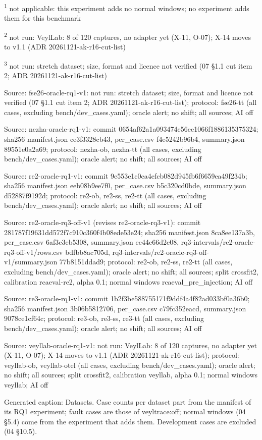 \par\raggedright\noindent
\textsuperscript{1} not applicable: this experiment adds no normal windows; no experiment adds them for this benchmark\par
\textsuperscript{2} not run: VeylLab: 8 of 120 captures, no adapter yet (X-11, O-07); X-14 moves to v1.1 (ADR 20261121-ak-r16-cut-list)\par
\textsuperscript{3} not run: stretch dataset; size, format and licence not verified (07 \S{}1.1 cut item 2; ADR 20261121-ak-r16-cut-list)\par
\noindent Source: fse26-oracle-rq1-v1: not run: stretch dataset; size, format and licence not verified (07 \S{}1.1 cut item 2; ADR 20261121-ak-r16-cut-list); protocol: fse26-tt (all cases, excluding bench/\allowbreak{}dev\_cases.yaml); oracle alert; no shift; all sources; AI off\par
\noindent Source: nezha-oracle-rq1-v1: commit 0654af62a1a093474e56ee1066f1886135375324; sha256 manifest.json ce3f3328cb43, per\_case.csv f4e5242b96b4, summary.json 89551e0a2a69; protocol: nezha-ob, nezha-tt (all cases, excluding bench/\allowbreak{}dev\_cases.yaml); oracle alert; no shift; all sources; AI off\par
\noindent Source: re2-oracle-rq1-v1: commit 9e553e1c0ca4efcb082d945fb6f6659ea49f234b; sha256 manifest.json eeb08b9ee7f0, per\_case.csv b5c320cd0bde, summary.json d52887f9192d; protocol: re2-ob, re2-ss, re2-tt (all cases, excluding bench/\allowbreak{}dev\_cases.yaml); oracle alert; no shift; all sources; AI off\par
\noindent Source: re2-oracle-rq3-off-v1 (revises re2-oracle-rq3-v1): commit 281787f19631dd572f7c910c360f4b08ede53e24; sha256 manifest.json 8ca8ee137a3b, per\_case.csv 6af3c3eb5308, summary.json ee44c66d2e08, rq3-intervals/\allowbreak{}re2-oracle-rq3-off-v1/\allowbreak{}rows.csv bdfbb8ac705d, rq3-intervals/\allowbreak{}re2-oracle-rq3-off-v1/\allowbreak{}summary.json 77b8151ddad9; protocol: re2-ob, re2-ss, re2-tt (all cases, excluding bench/\allowbreak{}dev\_cases.yaml); oracle alert; no shift; all sources; split crossfit2, calibration rcaeval-re2, alpha 0.1; normal windows rcaeval\_pre\_injection; AI off\par
\noindent Source: re3-oracle-rq1-v1: commit 1b2f3be588755171f9ddf4a4f82ad033bf0a36b0; sha256 manifest.json 3b06b5812706, per\_case.csv c79fc352eacd, summary.json 9078ce1cf64c; protocol: re3-ob, re3-ss, re3-tt (all cases, excluding bench/\allowbreak{}dev\_cases.yaml); oracle alert; no shift; all sources; AI off\par
\noindent Source: veyllab-oracle-rq1-v1: not run: VeylLab: 8 of 120 captures, no adapter yet (X-11, O-07); X-14 moves to v1.1 (ADR 20261121-ak-r16-cut-list); protocol: veyllab-ob, veyllab-otel (all cases, excluding bench/\allowbreak{}dev\_cases.yaml); oracle alert; no shift; all sources; split crossfit2, calibration veyllab, alpha 0.1; normal windows veyllab; AI off\par
\noindent Generated caption: Datasets. Case counts per dataset part from the manifest of its RQ1 experiment; fault cases are those of veyltrace:off; normal windows (04 \S{}5.4) come from the experiment that adds them. Development cases are excluded (04 \S{}10.5).\par
\endgroup
